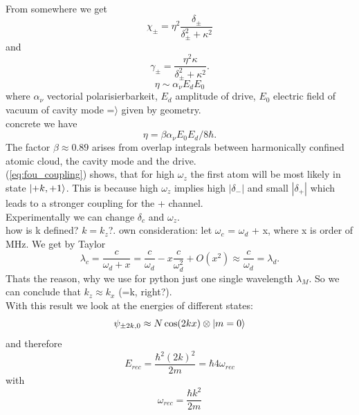 \\
From somewhere we get
\begin{equation}\label{eq:fou_coupling}
	\chi_\pm = \eta^2 \frac{\delta_\pm}{\delta_\pm^2 + \kappa^2}
\end{equation}
and
\begin{equation}
	\gamma_\pm = \frac{\eta^2 \kappa}{\delta_\pm^2 + \kappa^2}.
\end{equation}
\begin{equation}
	\eta \sim \alpha_\nu E_d E_0
\end{equation}
where $\alpha_\nu$ vectorial polarisierbarkeit, $E_d$ amplitude of drive, $E_0$ electric field of vacuum of cavity mode =$\rangle$ given by geometry.
\\
concrete we have
\begin{equation}
	\eta = \beta \alpha_\nu E_0 E_d / 8 \hbar.
\end{equation}
The factor $\beta \approx 0.89$ arises from overlap integrals between harmonically confined atomic cloud, the cavity mode and the drive.
\\
 (\ref{eq:fou_coupling}) shows, that for high $\omega_z$ the first atom will be most likely in state $\ket{+k,+1}$. This is because high $\omega_z$ implies high $| \delta_- |$ and small $| \delta_+ |$ which leads to a stronger coupling for the + channel. 
\\
Experimentally we can change $\delta_c$ and $\omega_z$.  
\\ 
 how is k defined? $k=k_z$?. own consideration: let $\omega_c$ = $\omega_d$ + x, where x is order of MHz. We get by Taylor
 \begin{equation}
 	\lambda_c = \frac{c}{\omega_d + x} = \frac{c}{\omega_d}- x \frac{c}{\omega_d^2} + O(x^2) \approx \frac{c}{\omega_d} = \lambda_d.
 \end{equation}
Thats the reason, why we use for python just one single wavelength $\lambda_M$. So we can conclude that $k_z \approx k_x$ (=k, right?). 
 \\
 With this result we look at the energies of different states: 
 \begin{equation}
 	\psi_{\pm 2 k, 0} \approx N \cos(2kx) \otimes \ket{m=0}
 \end{equation}
 and therefore
 \begin{equation}
 	E_{rec} = \frac{\hbar^2 (2k)^2}{2m} = \hbar 4 \omega_{rec}
 \end{equation}
 with 
 \begin{equation}
 	\omega_{rec} =  \frac{\hbar k^2}{2m}
 \end{equation}
